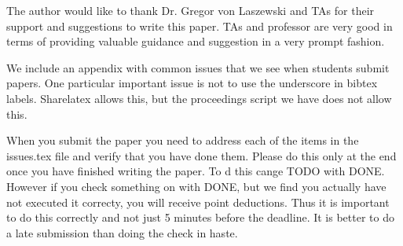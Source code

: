 \begin{acks}

  The author would like to thank Dr. Gregor von Laszewski and TAs for their
  support and suggestions to write this paper. TAs and professor are very good in terms of providing valuable 
  guidance and suggestion in a very prompt fashion. 

\end{acks}


 

\appendix

We include an appendix with common issues that we see when students
submit papers. One particular important issue is not to use the
underscore in bibtex labels. Sharelatex allows this, but the
proceedings script we have does not allow this.

When you submit the paper you need to address each of the items in the
issues.tex file and verify that you have done them. Please do this
only at the end once you have finished writing the paper. To d this
cange TODO with DONE. However if you check something on with DONE, but
we find you actually have not executed it correcty, you will receive
point deductions. Thus it is important to do this correctly and not
just 5 minutes before the deadline. It is better to do a late
submission than doing the check in haste. 



